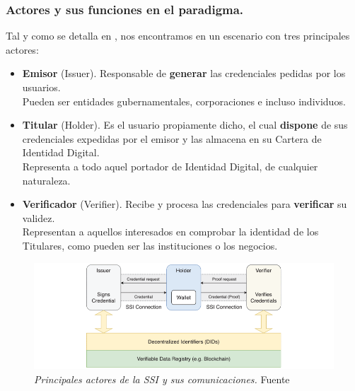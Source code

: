 \documentclass[../main.tex]{subfiles}
\begin{document}
\newpage
\subsubsection{Actores y sus funciones en el paradigma.}\label{Actores y sus funciones en el paradigma}
Tal y como se detalla en \cite{ChallengesSSI}, nos encontramos en un escenario con tres principales actores:

\begin{itemize}
    \item \textbf{Emisor} (Issuer). Responsable de \textbf{generar} las credenciales pedidas por los usuarios. 
    \\ Pueden ser entidades gubernamentales, corporaciones e incluso individuos.
    
    \item \textbf{Titular} (Holder). Es el usuario propiamente dicho, el cual \textbf{dispone} de sus credenciales expedidas por el emisor y las almacena en su Cartera de Identidad Digital. 
     \\ Representa a todo aquel portador de Identidad Digital, de cualquier naturaleza.
    
    \item \textbf{Verificador} (Verifier). Recibe y procesa las credenciales para \textbf{verificar} su validez. 
    \\ Representan a aquellos interesados en comprobar la identidad de los Titulares, como pueden ser las instituciones o los negocios. 
    \\
\end{itemize}

\begin{figure}[htbp]
    \centering
    \includegraphics[width=1\linewidth]{images/ActoresSSI.png}
    \caption{\textit{Principales actores de la \acrshort{SSI} y sus comunicaciones.} Fuente \cite{ChallengesSSI}}
    \label{fig:actoresSSI}
\end{figure}
\end{document}
